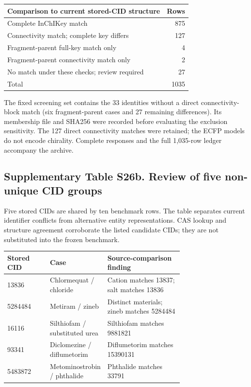\begin{center}
\small
\begin{tabular}{lr}
\toprule
Comparison to current stored-CID structure & Rows \\
\midrule
Complete InChIKey match & 875 \\
Connectivity match; complete key differs & 127 \\
Fragment-parent full-key match only & 4 \\
Fragment-parent connectivity match only & 2 \\
No match under these checks; review required & 27 \\
Total & 1035 \\
\bottomrule
\end{tabular}
\end{center}

The fixed screening set contains the 33 identities without a
direct connectivity-block match (six fragment-parent cases and 27 remaining
differences). Its membership file and SHA256 were recorded before evaluating
the exclusion sensitivity. The 127 direct connectivity matches were retained;
the ECFP models do not encode chirality. Complete responses and the full 1,035-row
ledger accompany the archive.

\subsection*{Supplementary Table S26b. Review of five non-unique CID groups}

Five stored CIDs are shared by ten benchmark rows. The table separates
current identifier conflicts from alternative entity representations. CAS lookup
and structure agreement corroborate the listed candidate CIDs; they are not
substituted into the frozen benchmark.

\begin{center}
\small
\begin{tabular}{lp{0.29\linewidth}p{0.43\linewidth}}
\toprule
Stored CID & Case & Source-comparison finding \\
\midrule
13836 & Chlormequat / chloride & Cation matches 13837; salt matches 13836 \\
5284484 & Metiram / zineb & Distinct materials; zineb matches 5284484 \\
16116 & Silthiofam / substituted urea & Silthiofam matches 9881821 \\
93341 & Diclomezine / diflumetorim & Diflumetorim matches 15390131 \\
5483872 & Metominostrobin / phthalide & Phthalide matches 33791 \\
\bottomrule
\end{tabular}
\end{center}


